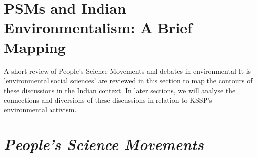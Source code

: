 \documentclass[twoside, 13pt]{article}
\begin{document}
\vspace{-.8cm}

{\fontsize{18}{20}\selectfont\section*{PSMs and Indian Environmentalism: A Brief Mapping}}

\vspace{-.4cm}

{\fontsize{12}{14}\selectfont A short review of People’s Science Movements and debates in environmental It is 'environmental social sciences' are reviewed in this section to map the contours of these discussions in the Indian context. In later sections, we will analyse the connections and diversions of these discussions in relation to KSSP’s environmental activism.} 


{\fontsize{18}{20}\selectfont\section*{\textit{People’s Science Movements}}}

\vspace{-.3cm}
\end{document}
